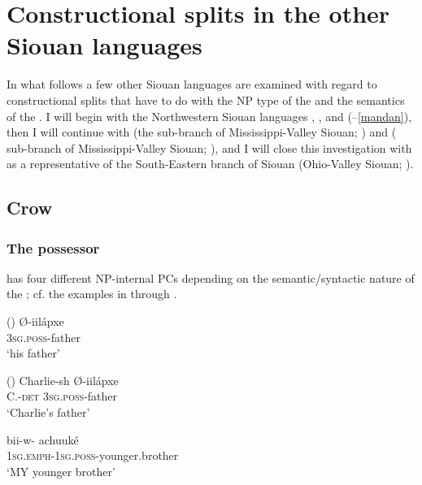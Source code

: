 \documentclass[output=paper]{LSP/langsci}
\begin{document}
\section{Constructional splits in the other Siouan languages}

In what follows a few other Siouan languages are examined with regard to constructional splits that have to do with the NP type of the  and the semantics of the . I will begin with the Northwestern Siouan languages , , and  (--\ref{mandan}), then I will continue with  (the  sub-branch of Mississippi-Valley Siouan; ) and  ( sub-branch of Mississippi-Valley Siouan; ), and I will close this investigation with  as a representative of the South-Eastern branch of Siouan (Ohio-Valley Siouan; ).
 
\subsection{Crow}\label{sec:helmbrecht:4.1} \label{crow} 
\subsubsection{The possessor}
 has four different NP-internal PCs depending on the semantic/syntactic nature of the ; cf. the examples in  through . 

\ea {} (\citealt[234]{Graczyk2007}) \label{crowfather}
\ex
\gll Ø-iilápxe \\
\textsc{3sg.poss}-father \\
\glt `his father'
\z
\z

\ea {} (\citealt[234]{Graczyk2007}) \label{crowcharlie}
\ex
\gll Charlie-sh 		Ø-iilápxe \\
C.-\textsc{det}      \textsc{3sg.poss}-father \\
\glt `Charlie's father'
\z \z

\ea	{} \citep[235]{Graczyk2007} \label{crowbrother}
\ex 
\gll bii-w- achuuké \\
\textsc{1sg.emph-1sg.poss}-younger.brother \\
\glt `MY younger brother'
\z \z
\end{document}
